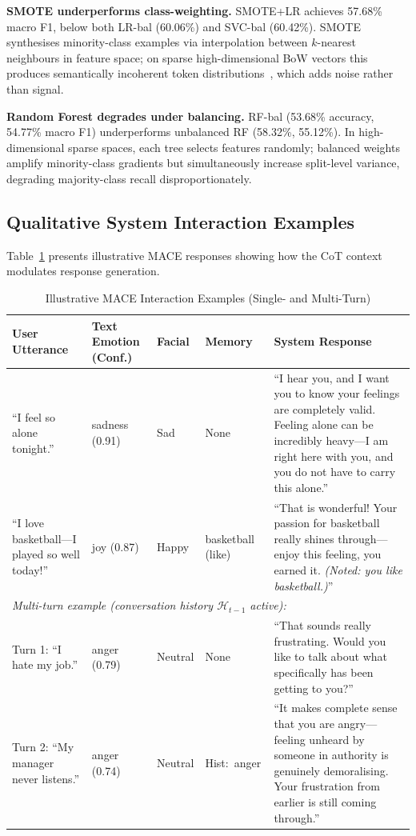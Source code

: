 \documentclass[sigconf, review=true]{acmart}
\begin{document}
\textbf{SMOTE underperforms class-weighting.}
SMOTE+LR achieves 57.68\% macro F1, below both LR-bal
(60.06\%) and SVC-bal (60.42\%).
SMOTE synthesises minority-class examples via interpolation
between $k$-nearest neighbours in feature space; on sparse
high-dimensional BoW vectors this produces semantically
incoherent token distributions~\cite{blagus2013smote},
which adds noise rather than signal.

\textbf{Random Forest degrades under balancing.}
RF-bal (53.68\% accuracy, 54.77\% macro F1) underperforms
unbalanced RF (58.32\%, 55.12\%).
In high-dimensional sparse spaces, each tree selects features
randomly; balanced weights amplify minority-class gradients
but simultaneously increase split-level variance, degrading
majority-class recall disproportionately.

\subsection{Qualitative System Interaction Examples}

Table~\ref{tab:qual} presents illustrative MACE responses
showing how the CoT context modulates response generation.

\begin{table}[t]
\centering
\caption{Illustrative MACE Interaction Examples (Single- and Multi-Turn)}
\label{tab:qual}
\begin{tabular}{p{2.6cm}p{2.1cm}p{1.8cm}p{1.6cm}p{5.7cm}}
\toprule
\textbf{User Utterance} & \textbf{Text Emotion (Conf.)} &
\textbf{Facial} & \textbf{Memory} & \textbf{System Response} \\
\midrule
``I feel so alone tonight.'' &
sadness (0.91) & Sad & None &
``I hear you, and I want you to know your feelings are completely
 valid. Feeling alone can be incredibly heavy---I am right
 here with you, and you do not have to carry this alone.'' \\
\addlinespace
``I love basketball---I played so well today!'' &
joy (0.87) & Happy & basketball (like) &
``That is wonderful! Your passion for basketball really shines
 through---enjoy this feeling, you earned it.
 \emph{(Noted: you like basketball.)}'' \\
\midrule
\multicolumn{5}{l}{\textit{Multi-turn example (conversation
history $\mathcal{H}_{t-1}$ active):}}\\[2pt]
Turn 1: ``I hate my job.'' &
anger (0.79) & Neutral & None &
``That sounds really frustrating. Would you like to talk about
 what specifically has been getting to you?'' \\
Turn 2: ``My manager never listens.'' &
anger (0.74) & Neutral &
\mbox{Hist: anger} &
``It makes complete sense that you are angry---feeling unheard
 by someone in authority is genuinely demoralising.
 Your frustration from earlier is still coming through.'' \\
\bottomrule
\end{tabular}
\end{table}
\end{document}
